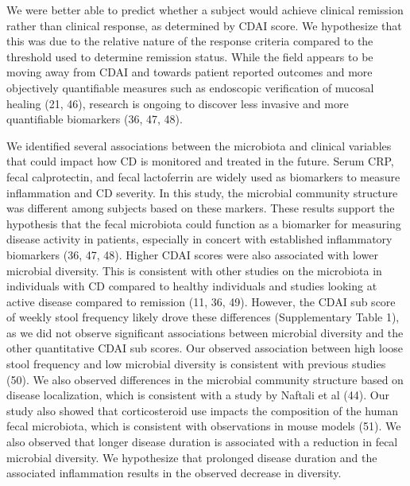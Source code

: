 \documentclass[12pt,]{article}
\begin{document}
We were better able to predict whether a subject would achieve clinical
remission rather than clinical response, as determined by CDAI score. We
hypothesize that this was due to the relative nature of the response
criteria compared to the threshold used to determine remission status.
While the field appears to be moving away from CDAI and towards patient
reported outcomes and more objectively quantifiable measures such as
endoscopic verification of mucosal healing (21, 46), research is ongoing
to discover less invasive and more quantifiable biomarkers (36, 47, 48).

We identified several associations between the microbiota and clinical
variables that could impact how CD is monitored and treated in the
future. Serum CRP, fecal calprotectin, and fecal lactoferrin are widely
used as biomarkers to measure inflammation and CD severity. In this
study, the microbial community structure was different among subjects
based on these markers. These results support the hypothesis that the
fecal microbiota could function as a biomarker for measuring disease
activity in patients, especially in concert with established
inflammatory biomarkers (36, 47, 48). Higher CDAI scores were also
associated with lower microbial diversity. This is consistent with other
studies on the microbiota in individuals with CD compared to healthy
individuals and studies looking at active disease compared to remission
(11, 36, 49). However, the CDAI sub score of weekly stool frequency
likely drove these differences (Supplementary Table 1), as we did not
observe significant associations between microbial diversity and the
other quantitative CDAI sub scores. Our observed association between
high loose stool frequency and low microbial diversity is consistent
with previous studies (50). We also observed differences in the
microbial community structure based on disease localization, which is
consistent with a study by Naftali et al (44). Our study also showed
that corticosteroid use impacts the composition of the human fecal
microbiota, which is consistent with observations in mouse models (51).
We also observed that longer disease duration is associated with a
reduction in fecal microbial diversity. We hypothesize that prolonged
disease duration and the associated inflammation results in the observed
decrease in diversity.
\end{document}
